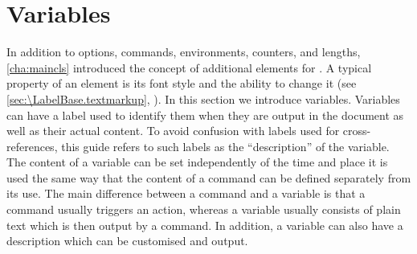 \section{Variables}
%
\BeginIndexGroup
{}

In addition to options, commands, environments, counters, and lengths,
\autoref{cha:maincls} introduced the concept of additional elements for
\KOMAScript{}. A typical property of an element is its font style and the
ability to change it (see \autoref{sec:\LabelBase.textmarkup},
). In this section we introduce
variables. Variables can have a label used to identify them when they are
output in the document as well as their actual content. To avoid confusion
with labels used for cross-references, this guide refers to such labels as the
``description'' of the variable. The content of a variable can be set
independently of the time and place it is used the same way that the content
of a command can be defined separately from its use. The main difference
between a command and a variable is that a command usually triggers an action,
whereas a variable usually consists of plain text which is then output by a
command. In addition, a variable can also have a description which can be
customised and output.

